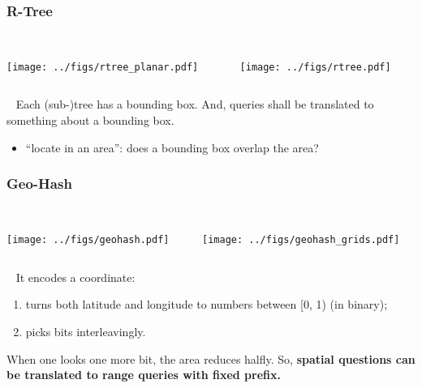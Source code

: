 \documentclass[lualatex]{beamer}
\renewcommand{\emph}{\textbf}
\begin{document}

\begin{frame}
  \frametitle{R-Tree}
  \begin{columns}[t]
    \begin{column}{0.3\textwidth}
      ~\\
      \texttt{[image: ../figs/rtree\_planar.pdf]}
    \end{column}
    \begin{column}{0.4\textwidth}
      ~\\
      \texttt{[image: ../figs/rtree.pdf]}
    \end{column}
  \end{columns}
  \begin{block}{~}
    Each (sub-)tree has a bounding box.
    And, queries shall be translated to something about a bounding box.
    \begin{itemize}
      \item ``locate in an area'': does a bounding box overlap the area?
    \end{itemize}
  \end{block}
\end{frame}

\begin{frame}
  \frametitle{Geo-Hash}
  \begin{columns}[t]
    \begin{column}{0.4\textwidth}
      ~\\
      \texttt{[image: ../figs/geohash.pdf]}
    \end{column}
    \begin{column}{0.4\textwidth}
      ~\\
      \texttt{[image: ../figs/geohash\_grids.pdf]}
    \end{column}
  \end{columns}
  \begin{block}{~}
    It encodes a coordinate:
    \begin{enumerate}
      \item turns both latitude and longitude to numbers between [0, 1) (in binary);
      \item picks bits interleavingly.
    \end{enumerate}
    When one looks one more bit, the area reduces halfly.
    So, \emph{spatial questions can be translated to range queries with fixed prefix.}
  \end{block}
\end{frame}
\end{document}
